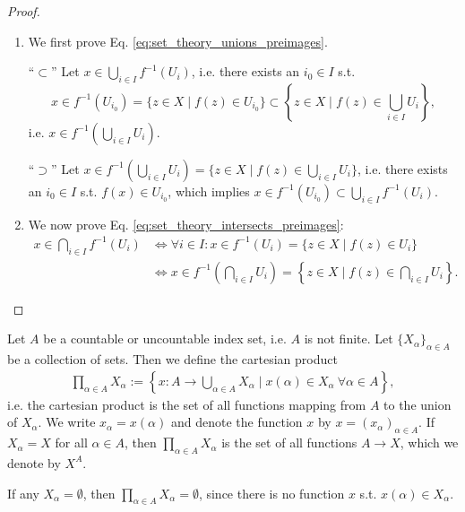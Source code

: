 \begin{proof}
	\begin{enumerate}
		\item We first prove Eq. \eqref{eq:set_theory_unions_preimages}. 		
		
		\enquote{$\subset$} Let $x\in \bigcup_{i\in I}f^{-1}(U_i)$, i.e. there exists an $i_0\in I$ s.t. $$x\in f^{-1}(U_{i_0}) = \{z\in X\mid f(z)\in U_{i_0}\} \subset \left\{ z\in X\mid f(z)\in \bigcup_{i\in I}U_i \right\},$$
		i.e. $x\in f^{-1}\left(\bigcup_{i\in I}U_i\right)$.
		
		\enquote{$\supset$} Let $x\in f^{-1}(\bigcup_{i\in I}U_i) = \{z\in X \mid f(z)\in \bigcup_{i\in I}U_i\}$, i.e. there exists an $i_0\in I$ s.t. $f(x)\in U_{i_0}$, which implies $x\in f^{-1}(U_{i_0}) \subset \bigcup_{i\in I}f^{-1}(U_i)$.
		
		\item We now prove Eq. \eqref{eq:set_theory_intersects_preimages}:
		\begin{align*}
			x\in \bigcap_{i\in I}f^{-1}(U_i) &\Leftrightarrow \forall i\in I: x\in f^{-1}(U_i) = \{z\in X\mid f(z)\in U_i\}
			\\ &\Leftrightarrow x\in f^{-1}\left(\bigcap_{i\in I}U_i\right) = \left\{z\in X\mid f(z)\in \bigcap_{i\in I}U_i\right\}.
		\end{align*}
	\end{enumerate}
\end{proof}

\begin{defn}\label{defn:infinite_cartesian_prods}
	Let $A$ be a countable or uncountable index set, i.e. $A$ is not finite. Let $\{X_{\alpha}\}_{\alpha\in A}$ be a collection of sets. Then we define the cartesian product
	\begin{align}
		\prod_{\alpha\in A}X_{\alpha} := \left\{x: A\to\bigcup_{\alpha\in A}X_{\alpha} \mid x(\alpha)\in X_{\alpha} \ \forall \alpha\in A\right\},
	\end{align}
	i.e. the cartesian product is the set of all functions mapping from $A$ to the union of $X_{\alpha}$. We write $x_{\alpha} = x(\alpha)$ and denote the function $x$ by $x = (x_{\alpha})_{\alpha\in A}$. If $X_{\alpha} = X$ for all $\alpha\in A$, then $\prod_{\alpha\in A}X_{\alpha}$ is the set of all functions $A\to X$, which we denote by $X^{A}$.
\end{defn}

\begin{remark}
	If any $X_{\alpha} = \emptyset$, then $\prod_{\alpha\in A}X_{\alpha} = \emptyset$, since there is no function $x$ s.t. $x(\alpha) \in X_{\alpha}$.
\end{remark}